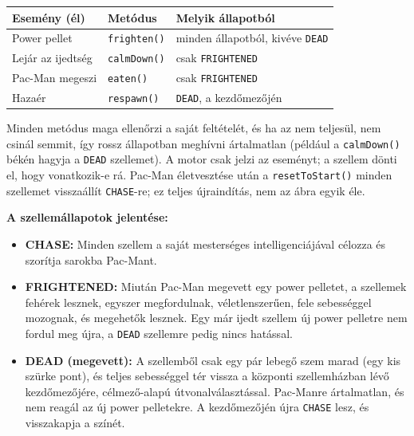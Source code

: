 \documentclass[11pt, a4paper]{article}
\begin{document}
\begin{itemize}
    \vspace{0.1cm}
    \begin{tabular}{@{}lll@{}}
        \toprule
        \textbf{Esemény (él)} & \textbf{Metódus} & \textbf{Melyik állapotból} \\
        \midrule
        Power pellet & \texttt{frighten()} & minden állapotból, kivéve \texttt{DEAD} \\
        Lejár az ijedtség & \texttt{calmDown()} & csak \texttt{FRIGHTENED} \\
        Pac-Man megeszi & \texttt{eaten()} & csak \texttt{FRIGHTENED} \\
        Hazaér & \texttt{respawn()} & \texttt{DEAD}, a kezdőmezőjén \\
        \bottomrule
    \end{tabular}
    \vspace{0.1cm}

    Minden metódus maga ellenőrzi a saját feltételét, és ha az nem teljesül, nem csinál semmit, így rossz állapotban meghívni ártalmatlan (például a \texttt{calmDown()} békén hagyja a \texttt{DEAD} szellemet). A motor csak jelzi az eseményt; a szellem dönti el, hogy vonatkozik-e rá. Pac-Man életvesztése után a \texttt{resetToStart()} minden szellemet visszaállít \texttt{CHASE}-re; ez teljes újraindítás, nem az ábra egyik éle.
    
    \vspace{0.2cm}
    \textbf{A szellemállapotok jelentése:}
    \begin{itemize}
        \item \textbf{CHASE:} Minden szellem a saját mesterséges intelligenciájával célozza és szorítja sarokba Pac-Mant.
        \item \textbf{FRIGHTENED:} Miután Pac-Man megevett egy power pelletet, a szellemek fehérek lesznek, egyszer megfordulnak, véletlenszerűen, fele sebességgel mozognak, és megehetők lesznek. Egy már ijedt szellem új power pelletre nem fordul meg újra, a \texttt{DEAD} szellemre pedig nincs hatással.
        \item \textbf{DEAD (megevett):} A szellemből csak egy pár lebegő szem marad (egy kis szürke pont), és teljes sebességgel tér vissza a központi szellemházban lévő kezdőmezőjére, célmező-alapú útvonalválasztással. Pac-Manre ártalmatlan, és nem reagál az új power pelletekre. A kezdőmezőjén újra \texttt{CHASE} lesz, és visszakapja a színét.
    \end{itemize}


\end{itemize}
\end{document}
